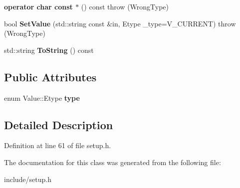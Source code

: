 \begin{DoxyCompactItemize}
\item 
\hypertarget{classValue_a34c3d3e97da4667b1ac6932b3a16fb92}{{\bfseries operator char const $\ast$} () const   throw (\-Wrong\-Type)}\label{classValue_a34c3d3e97da4667b1ac6932b3a16fb92}

\item 
\hypertarget{classValue_a7c785d7517533757bf9b3f7a15cc4e6a}{bool {\bfseries Set\-Value} (std\-::string const \&in, Etype \-\_\-type=V\-\_\-\-C\-U\-R\-R\-E\-N\-T)  throw (\-Wrong\-Type)}\label{classValue_a7c785d7517533757bf9b3f7a15cc4e6a}

\item 
\hypertarget{classValue_a119123aaf6e24a5dc9e19cf06ce734b8}{std\-::string {\bfseries To\-String} () const }\label{classValue_a119123aaf6e24a5dc9e19cf06ce734b8}

\end{DoxyCompactItemize}
\subsection*{Public Attributes}
\begin{DoxyCompactItemize}
\item 
\hypertarget{classValue_aa8611755fd5d52ca0e16f5cd8caed48f}{enum Value\-::\-Etype {\bfseries type}}\label{classValue_aa8611755fd5d52ca0e16f5cd8caed48f}

\end{DoxyCompactItemize}


\subsection{Detailed Description}


Definition at line 61 of file setup.\-h.



The documentation for this class was generated from the following file\-:\begin{DoxyCompactItemize}
\item 
include/setup.\-h\end{DoxyCompactItemize}
